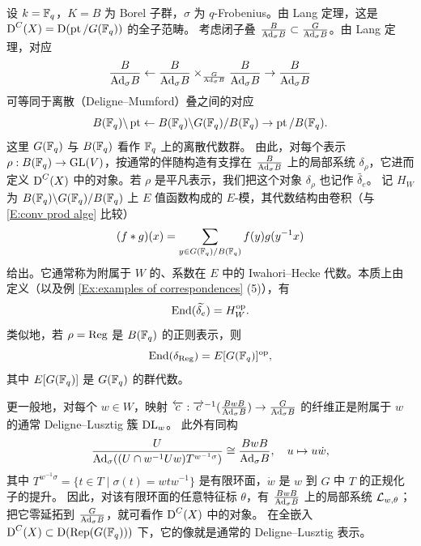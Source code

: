 \begin{ex}
\label{Ex:DL}
设 $k={\mathbb F}_q$，$K=B$ 为 Borel 子群，$\sigma$ 为 $q$-Frobenius。由 Lang 定理，这是 $\operatorname{D}^C(X)=\operatorname{D}(\operatorname{pt}/G({\mathbb F}_q))$ 的全子范畴。
考虑闭子叠 $\frac{B}{{\operatorname{Ad}}_\sigma B}\subset \frac{G}{{\operatorname{Ad}}_\sigma B}$。由 Lang 定理，对应
\[\frac{B}{{\operatorname{Ad}}_\sigma B}\leftarrow\frac{B}{{\operatorname{Ad}}_\sigma B}\times_{\frac{G}{{\operatorname{Ad}}_\sigma B}}\frac{B}{{\operatorname{Ad}}_\sigma B}\rightarrow \frac{B}{{\operatorname{Ad}}_\sigma B}\]
可等同于离散（Deligne–Mumford）叠之间的对应
\begin{equation}
\label{E:Hk for unit}
B({\mathbb F}_q)\backslash \operatorname{pt}\leftarrow B({\mathbb F}_q)\backslash G({\mathbb F}_q)/B({\mathbb F}_q)\rightarrow \operatorname{pt}/B({\mathbb F}_q).
\end{equation}
这里 $G({\mathbb F}_q)$ 与 $B({\mathbb F}_q)$ 看作 ${\mathbb F}_q$ 上的离散代数群。
由此，对每个表示 $\rho: B({\mathbb F}_q)\to {\operatorname{GL}}(V)$，按通常的伴随构造有支撑在 $\frac{B}{{\operatorname{Ad}}_\sigma B}$ 上的局部系统 $\delta_\rho$，它进而定义 $\operatorname{D}^C(X)$ 中的对象。若 $\rho$ 是平凡表示，我们把这个对象 $\delta_\rho$ 也记作 $\widetilde{\delta_e}$。
记 $H_W$ 为 $B({\mathbb F}_q)\backslash G({\mathbb F}_q)/B({\mathbb F}_q)$ 上 $E$ 值函数构成的 $E$-模，其代数结构由卷积（与 \eqref{E:conv prod alge} 比较）
\[(f*g)(x)=\sum_{y\in G({\mathbb F}_q)/B({\mathbb F}_q)} f(y)g(y^{-1}x)\]
给出。它通常称为附属于 $W$ 的、系数在 $E$ 中的 Iwahori–Hecke 代数。本质上由定义（以及例 \ref{Ex:examples of correspondences} (5)），有
\begin{equation}
\label{E:endo for unit}
{\operatorname{End}}(\widetilde{\delta_{e}})=H^{\operatorname{op}}_W.
\end{equation}
类似地，若 $\rho=\operatorname{Reg}$ 是 $B({\mathbb F}_q)$ 的正则表示，则
\begin{equation}
\label{E:endo for reg}
{\operatorname{End}}(\delta_{\operatorname{Reg}})=E[G({\mathbb F}_q)]^{\operatorname{op}},
\end{equation}
其中 $E[G({\mathbb F}_q)]$ 是 $G({\mathbb F}_q)$ 的群代数。

更一般地，对每个 $w\in W$，映射 $\overleftarrow{c}: \overrightarrow{c}^{-1}(\frac{BwB}{{\operatorname{Ad}}_\sigma B})\to \frac{G}{{\operatorname{Ad}}_\sigma B}$ 的纤维正是附属于 $w$ 的通常 Deligne–Lusztig 簇 $\operatorname{DL}_w$。
此外有同构
\[  \frac{U}{{\operatorname{Ad}}_\sigma ((U \cap w^{-1}Uw)T^{w^{-1}\sigma})}\cong \frac{BwB}{{\operatorname{Ad}}_\sigma B},\quad u\mapsto u\dot{w},\]
其中 $T^{w^{-1}\sigma}=\{t\in T\mid \sigma(t)=wtw^{-1}\}$ 是有限环面，$\dot{w}$ 是 $w$ 到 $G$ 中 $T$ 的正规化子的提升。
因此，对该有限环面的任意特征标 $\theta$，有 $\frac{BwB}{{\operatorname{Ad}}_\sigma B}$ 上的局部系统 ${\mathcal L}_{w,\theta}$；把它零延拓到 $\frac{G}{{\operatorname{Ad}}_\sigma B}$，就可看作 $\operatorname{D}^{C}(X)$ 中的对象。
在全嵌入 $\operatorname{D}^{C}(X)\subset \operatorname{D}(\operatorname{Rep}(G({\mathbb F}_q)))$ 下，它的像就是通常的 Deligne–Lusztig 表示。
\end{ex}

